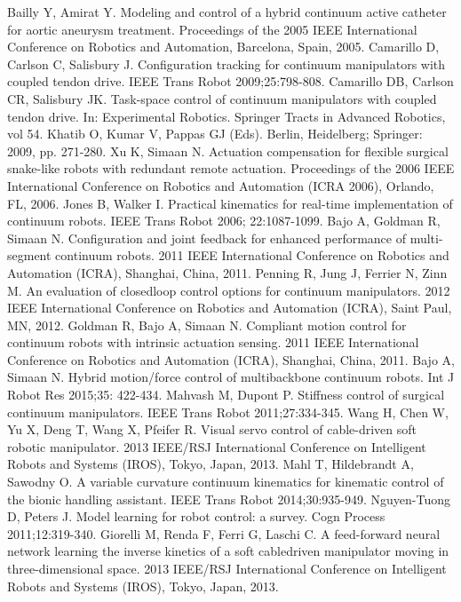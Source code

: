 \documentclass[12pt,twoside,a4]{mwbk}
\begin{document}
\begin{thebibliography}{9}
 Bailly Y, Amirat Y. Modeling and control of a hybrid continuum active catheter for aortic aneurysm treatment. Proceedings of the 2005 IEEE International Conference on Robotics and Automation, Barcelona, Spain, 2005.
 Camarillo D, Carlson C, Salisbury J. Configuration tracking for continuum manipulators with coupled tendon drive. IEEE Trans Robot 2009;25:798-808.
 Camarillo DB, Carlson CR, Salisbury JK. Task-space control of continuum manipulators with coupled tendon drive. In: Experimental Robotics. Springer Tracts in Advanced Robotics, vol 54. Khatib O, Kumar V, Pappas GJ (Eds). Berlin, Heidelberg; Springer: 2009, pp. 271-280.
 Xu K, Simaan N. Actuation compensation for flexible surgical snake-like robots with redundant remote actuation. Proceedings of the 2006 IEEE International Conference on Robotics and Automation (ICRA 2006), Orlando, FL, 2006.
 Jones B, Walker I. Practical kinematics for real-time implementation of continuum robots. IEEE Trans Robot 2006; 22:1087-1099.
 Bajo A, Goldman R, Simaan N. Configuration and joint feedback for enhanced performance of multi-segment continuum robots. 2011 IEEE International Conference on Robotics and Automation (ICRA), Shanghai, China, 2011.
 Penning R, Jung J, Ferrier N, Zinn M. An evaluation of closedloop control options for continuum manipulators. 2012 IEEE International Conference on Robotics and Automation (ICRA), Saint Paul, MN, 2012.
 Goldman R, Bajo A, Simaan N. Compliant motion control for continuum robots with intrinsic actuation sensing. 2011 IEEE International Conference on Robotics and Automation (ICRA), Shanghai, China, 2011.
 Bajo A, Simaan N. Hybrid motion/force control of multibackbone continuum robots. Int J Robot Res 2015;35: 422-434.
 Mahvash M, Dupont P. Stiffness control of surgical continuum manipulators. IEEE Trans Robot 2011;27:334-345. 
 Wang H, Chen W, Yu X, Deng T, Wang X, Pfeifer R. Visual servo control of cable-driven soft robotic manipulator. 2013 IEEE/RSJ International Conference on Intelligent Robots and Systems (IROS), Tokyo, Japan, 2013. 
 Mahl T, Hildebrandt A, Sawodny O. A variable curvature continuum kinematics for kinematic control of the bionic handling assistant. IEEE Trans Robot 2014;30:935-949.
 Nguyen-Tuong D, Peters J. Model learning for robot control: a survey. Cogn Process 2011;12:319-340.
 Giorelli M, Renda F, Ferri G, Laschi C. A feed-forward neural network learning the inverse kinetics of a soft cabledriven manipulator moving in three-dimensional space. 2013 IEEE/RSJ International Conference on Intelligent Robots and Systems (IROS), Tokyo, Japan, 2013.

\end{thebibliography}
\end{document}
